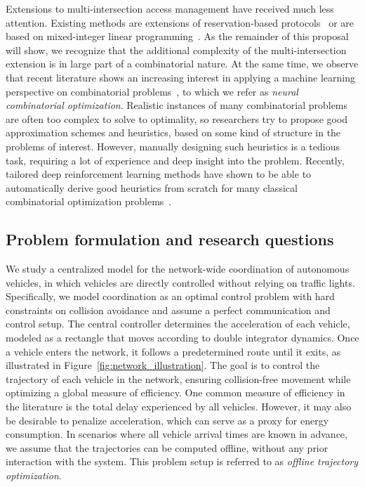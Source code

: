 \documentclass{article}
\theoremstyle{definition}
\theoremstyle{plain}
\begin{document}
Extensions to multi-intersection access management have received much less
attention. Existing methods are extensions of reservation-based protocols~\cite{hausknechtAutonomousIntersectionManagement} or
are based on mixed-integer linear programming~\cite{sartorCombinatorialLearningTraffic2019}.
As the remainder of this proposal will show, we recognize that the additional
complexity of the multi-intersection extension is in large part of a
combinatorial nature. At the same time, we observe that recent literature shows
an increasing interest in applying a machine learning perspective on
combinatorial problems~\cite{bengioMachineLearningCombinatorial2020,lodiLearningBranchingSurvey2017}, to which we refer as \textit{neural combinatorial
  optimization}. Realistic instances of many combinatorial
problems are often too complex to solve to optimality, so researchers try to
propose good approximation schemes and heuristics, based on some kind of
structure in the problems of interest. However, manually designing such
heuristics is a tedious task, requiring a lot of experience and deep insight
into the problem. Recently, tailored deep reinforcement learning methods have
shown to be able to automatically derive good heuristics from scratch for many
classical combinatorial optimization problems~\cite{belloNeuralCombinatorialOptimization2017,koolLearningOptimizationCombinatorial,mazyavkinaReinforcementLearningCombinatorial2020,smitGraphNeuralNetworks2024}.


\subsection{Problem formulation and research questions}

We study a centralized model for the network-wide coordination of autonomous
vehicles, in which vehicles are directly controlled without relying on traffic
lights. Specifically, we model coordination as an optimal control problem with
hard constraints on collision avoidance and assume a perfect
communication and control setup. The central controller determines the
acceleration of each vehicle, modeled as a rectangle that moves according to double
integrator dynamics. Once a vehicle enters the network, it follows a predetermined route
until it exits, as illustrated in Figure~\ref{fig:network_illustration}. The
goal is to control the trajectory of each vehicle in the network, ensuring
collision-free movement while optimizing a global measure of efficiency. One
common measure of efficiency in the literature is the total delay experienced by
all vehicles. However, it may also be desirable to penalize acceleration, which
can serve as a proxy for energy consumption. In scenarios where all vehicle
arrival times are known in advance, we assume that the trajectories can be
computed offline, without any prior interaction with the system. This problem setup is
referred to as \textit{offline trajectory optimization}.
\end{document}
